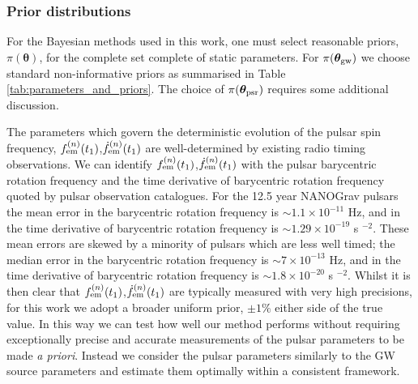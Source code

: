 \documentclass[fleqn,usenatbib,useAMS]{mnras}
\begin{document}
\subsubsection{Prior distributions}\label{sec:priors}

For the Bayesian methods used in this work, one must select reasonable priors, $\pi(\boldsymbol{\theta})$, for the complete set complete of static parameters. For $\pi(\boldsymbol{\theta}_{\rm gw})$ we choose standard non-informative priors \citep[e.g.][]{Bhagwat2021} as summarised in Table \ref{tab:parameters_and_priors}. The choice of $\pi(\boldsymbol{\theta}_{\rm psr})$ requires some additional discussion. \newline 


The parameters which govern the deterministic evolution of the pulsar spin frequency, $f_{\rm em}^{(n)} (t_1)$,$\dot{f}_{\rm em}^{(n)} (t_1)$ are well-determined by existing radio timing observations. We can identify $f_{\rm em}^{(n)} (t_1)$,$\dot{f}_{\rm em}^{(n)} (t_1)$ with the pulsar  barycentric rotation frequency and the time derivative of barycentric rotation frequency quoted by pulsar observation catalogues. For the 12.5 year NANOGrav pulsars the mean error in the barycentric rotation frequency is $\sim 1.1 \times 10^{-11}$ Hz, and in the time derivative of barycentric rotation frequency is $\sim 1.29 \times 10^{-19}$ s $^{-2}$. These mean errors are skewed by a minority of pulsars which are less well timed; the median error in  the barycentric rotation frequency is $\sim 7 \times 10^{-13}$ Hz, and in the time derivative of barycentric rotation frequency is $\sim 1.8 \times 10^{-20}$ s $^{-2}$. Whilst it is then clear that $f_{\rm em}^{(n)} (t_1)$,$\dot{f}_{\rm em}^{(n)} (t_1)$ are typically measured with very high precisions, for this work we adopt a broader uniform prior, $\pm 1 \%$ either side of the true value. In this way we can test how well our method performs without requiring exceptionally precise and accurate measurements of the pulsar parameters to be made \textit{a priori}. Instead we consider the pulsar parameters similarly to the GW source parameters and estimate them optimally within a consistent framework. \newline 
\end{document}
